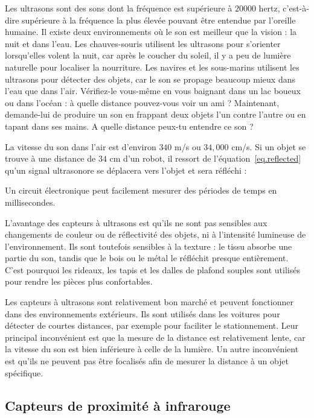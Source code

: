 Les ultrasons sont des sons dont la fréquence est supérieure à $20 000$ hertz, c'est-à-dire supérieure à la fréquence la plus élevée pouvant être entendue par l'oreille humaine. Il existe deux environnements où le son est meilleur que la vision : la nuit et dans l'eau. Les chauves-souris utilisent les ultrasons pour s'orienter lorsqu'elles volent la nuit, car après le coucher du soleil, il y a peu de lumière naturelle pour localiser la nourriture. Les navires et les sous-marins utilisent les ultrasons pour détecter des objets, car le son se propage beaucoup mieux dans l'eau que dans l'air. Vérifiez-le vous-même en vous baignant dans un lac boueux ou dans l'océan : à quelle distance pouvez-vous voir un ami ? Maintenant, demande-lui de produire un son en frappant deux objets l'un contre l'autre ou en tapant dans ses mains. A quelle distance peux-tu entendre ce son ? 

La vitesse du son dans l'air est d'environ $340$ m/s ou $34,000$ cm/s. Si un objet se trouve à une distance de $34$ cm d'un robot, il ressort de l'équation~\ref{eq.reflected} qu'un signal ultrasonore se déplacera vers l'objet et sera réfléchi :

Un circuit électronique peut facilement mesurer des périodes de temps en millisecondes.

L'avantage des capteurs à ultrasons est qu'ils ne sont pas sensibles aux changements de couleur ou de réflectivité des objets, ni à l'intensité lumineuse de l'environnement. Ils sont toutefois sensibles à la texture : le tissu absorbe une partie du son, tandis que le bois ou le métal le réfléchit presque entièrement. C'est pourquoi les rideaux, les tapis et les dalles de plafond souples sont utilisés pour rendre les pièces plus confortables.

Les capteurs à ultrasons sont relativement bon marché et peuvent fonctionner dans des environnements extérieurs. Ils sont utilisés dans les voitures pour détecter de courtes distances, par exemple pour faciliter le stationnement. Leur principal inconvénient est que la mesure de la distance est relativement lente, car la vitesse du son est bien inférieure à celle de la lumière. Un autre inconvénient est qu'ils ne peuvent pas être focalisés afin de mesurer la distance à un objet spécifique.

\subsection{Capteurs de proximité à infrarouge}

